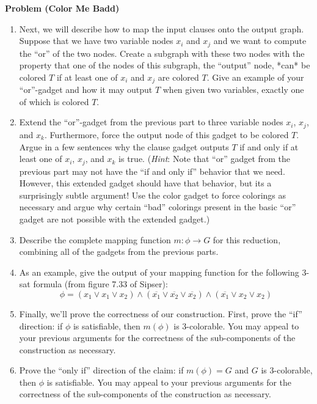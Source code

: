 \documentclass[12pt]{article}
\newcommand{\hint}[1]{(\emph{Hint}: #1)}
\newcounter{ProblemCounter}
\newenvironment{problem}[1][]
  {\refstepcounter{ProblemCounter}\noindent\textbf{Problem \theProblemCounter{} (#1)}\quad}
  {\newpage}
\newcommand{\comp}[1]{\ensuremath{\overline{#1}}\xspace}
\begin{document}
\begin{problem}[Color Me Badd]
\begin{enumerate}[itemsep=0pt, label=(\alph*)]
    Recall in our mapping function that we must map objects of our input
    domain---variables, clauses, and assignments of \( \phi \)---to objects in
    our output domain---nodes, edges, and colorings of \( G \).  First we will
    map the variables to nodes and assignments to colorings.  For each \( x_i
    \), we will create two nodes labeled \( x_i \) and \( \comp{x_i} \).
    Create a subgraph with these two nodes and the color gadget to force
    exactly one of the two nodes to be colored \( T \) and the other \( F \).
    Argue in a few sentences why your constructed subgraph correctly implements
    this behavior.
  \item Next, we will describe how to map the input clauses onto the output
    graph.  Suppose that we have two variable nodes \( x_i \) and \( x_j \) and
    we want to compute the ``or'' of the two nodes.  Create a subgraph with
    these two nodes with the property that one of the nodes of this subgraph,
    the ``output'' node, *can* be colored \( T \) if at least one of \( x_i \)
    and \( x_j \) are colored \( T \).  Give an example of your ``or''-gadget
    and how it may output \( T \) when given two variables, exactly one of
    which is colored \( T \).
  \item Extend the ``or''-gadget from the previous part to three variable nodes
    \( x_i \), \( x_j \), and \( x_k \).  Furthermore, force the output node of
    this gadget to be colored \( T \).  Argue in a few sentences why the clause
    gadget outputs \( T \) if and only if at least one of \( x_i \), \( x_j \),
    and \( x_k \) is true. \hint{Note that ``or'' gadget from the previous part
    may not have the ``if and only if'' behavior that we need.  However, this
    extended gadget should have that behavior, but its a surprisingly subtle
    argument! Use the color gadget to force colorings as necessary and argue
    why certain ``bad'' colorings present in the basic ``or'' gadget are not
    possible with the extended gadget.}
  \item Describe the complete mapping function \( m : \phi \rightarrow G \) for
    this reduction, combining all of the gadgets from the previous parts.
  \item As an example, give the output of your mapping function for the
    following 3-sat formula (from figure 7.33 of Sipser):
    \[
      \phi = (x_1 \vee x_1 \vee x_2) \wedge (\comp{x_1} \vee \comp{x_2} \vee
        \comp{x_2}) \wedge (\comp{x_1} \vee x_2 \vee x_2)
    \]
  \item Finally, we'll prove the correctness of our construction.  First, prove
    the ``if'' direction: if \( \phi \) is satisfiable, then \( m(\phi) \) is
    3-colorable.  You may appeal to your previous arguments for the correctness
    of the sub-components of the construction as necessary.
  \item Prove the ``only if'' direction of the claim: if \( m(\phi) = G \) and
    \( G \) is 3-colorable, then \( \phi \) is satisfiable.  You may appeal to
    your previous arguments for the correctness of the sub-components of the
    construction as necessary.
\end{enumerate}


\end{problem}
\end{document}
